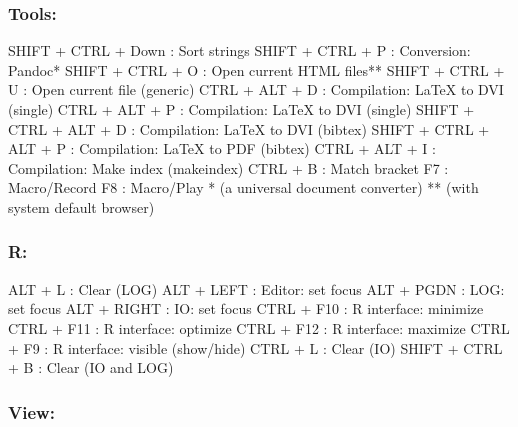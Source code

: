 \newpage
\subsubsection{Tools:}

\vspace{-0.5cm}
\begin{Rtables}[caption={[Tools menu keyboard shortcuts]
    ToolsMenu keyboard shortcuts},
  label=menu:tools]
  SHIFT + CTRL + Down    : Sort strings
  SHIFT + CTRL + P       : Conversion: Pandoc*
  SHIFT + CTRL + O       : Open current HTML files**
  SHIFT + CTRL + U       : Open current file (generic)
  CTRL  + ALT  + D       : Compilation: LaTeX to DVI (single)
  CTRL  + ALT  + P       : Compilation: LaTeX to DVI (single)
  SHIFT + CTRL + ALT + D : Compilation: LaTeX to DVI (bibtex)
  SHIFT + CTRL + ALT + P : Compilation: LaTeX to PDF (bibtex)
  CTRL  + ALT  + I       : Compilation: Make index (makeindex)
  CTRL  + B              : Match bracket
  F7                     : Macro/Record
  F8                     : Macro/Play
  *  (a universal document converter)
  ** (with system default browser)
\end{Rtables}


\subsubsection{R:}

\vspace{-0.5cm}
\begin{Rtables}[caption={[R menu keyboard shortcuts]
    R menu keyboard shortcuts},
  label=menu:r]
  ALT  + L         : Clear (LOG)
  ALT  + LEFT      : Editor: set focus
  ALT  + PGDN      : LOG: set focus
  ALT  + RIGHT     : IO: set focus
  CTRL + F10       : R interface: minimize
  CTRL + F11       : R interface: optimize
  CTRL + F12       : R interface: maximize
  CTRL + F9        : R interface: visible (show/hide)
  CTRL + L         : Clear (IO)
  SHIFT + CTRL + B : Clear (IO and LOG)
\end{Rtables}


\newpage
\subsubsection{View:}


